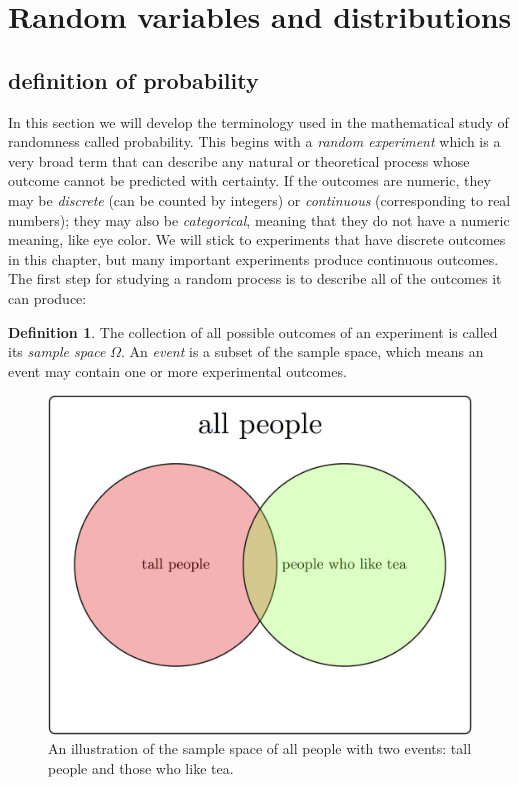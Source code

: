\documentclass[
]{book}
\theoremstyle{definition}
\newtheorem{definition}{Definition}[chapter]
\theoremstyle{definition}
\theoremstyle{definition}
\theoremstyle{remark}
\begin{document}
\hypertarget{random-variables-and-distributions-1}{%
\section{Random variables and distributions}\label{random-variables-and-distributions-1}}

\label{sec:math4_1}

\hypertarget{definition-of-probability}{%
\subsection{definition of probability}\label{definition-of-probability}}

In this section we will develop the terminology used in the mathematical study of randomness called probability. This begins with a \emph{random experiment} which is a very broad term that can describe any natural or theoretical process whose outcome cannot be predicted with certainty. If the outcomes are numeric, they may be \emph{discrete} (can be counted by integers) or \emph{continuous} (corresponding to real numbers); they may also be \emph{categorical}, meaning that they do not have a numeric meaning, like eye color. We will stick to experiments that have discrete outcomes in this chapter, but many important experiments produce continuous outcomes. The first step for studying a random process is to describe all of the outcomes it can produce:

\begin{definition}
\protect\hypertarget{def:def-sampspace}{}{\label{def:def-sampspace} }The collection of all possible outcomes of an experiment is called its \emph{sample space} \(\Omega\). An \emph{event} is a subset of the sample space, which means an event may contain one or more experimental outcomes.
\end{definition}

\begin{figure}
\centering
\includegraphics{ch4/sample_space.png}
\caption{An illustration of the sample space of all people with two events: tall people and those who like tea.}
\end{figure}
\end{document}
